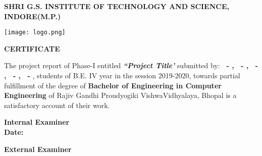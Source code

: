 \pagestyle{plain}
\large
\begin{center}
    


\textbf{SHRI G.S. INSTITUTE OF TECHNOLOGY AND SCIENCE, INDORE(M.P.)\\}

\vspace*{0.7cm}

\texttt{[image: logo.png]}

\vspace*{0.7cm}
\normalfont\LARGE\centering
\textbf{CERTIFICATE} \\
\end{center}
\normalsize
The project report of Phase-I entitled \emph{\textbf{``Project Title'}} submitted by:
\textbf{
\rollA\ - \nameA,
\rollB\ - \nameB,
\rollC\ - \nameC,
\rollD\ - \nameD,
\rollE\ - \nameE},
students of B.E. IV year in the session 2019-2020, towards partial fulfillment of the degree of \textbf{Bachelor of Engineering in Computer Engineering} of Rajiv Gandhi Proudyogiki VishwaVidhyalaya, Bhopal is a satisfactory account of their work.



\begin{minipage}[t]{0.45\textwidth}
    \flushleft
    \vspace*{3cm}
    \large
    \textbf{Internal Examiner\\}
    \vspace*{1.5cm}
    \textbf{Date:}
\end{minipage}
\hfill
\begin{minipage}[t]{0.45\textwidth}
    \flushleft
    \vspace*{3cm}
    \large
    \textbf{External Examiner}
  
\end{minipage}